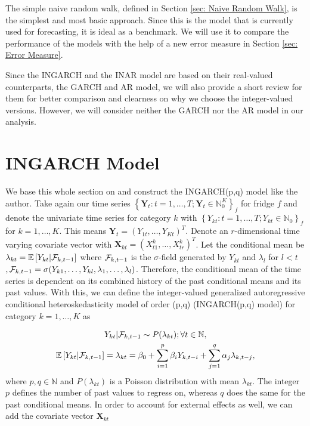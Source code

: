 The simple naive random walk, defined in Section \ref{sec: Naive Random Walk}, is the simplest and most basic approach. Since this is the model that is currently used for forecasting, it is ideal as a benchmark. We will use it to compare the performance of the models with the help of a new error measure in Section \ref{sec: Error Measure}. 

Since the INGARCH and the INAR model are based on their real-valued counterparts, the GARCH and AR model, we will also provide a short review for them for better comparison and clearness on why we choose the integer-valued versions. However, we will consider neither the GARCH nor the AR model in our analysis. 

\section{INGARCH Model}
\label{sec:Ingarch}

We base this whole section on \textcite{Liboschik:2016} and construct the INGARCH(p,q) model like the author. 
Take again our time series $\left\{\bm{Y}_t:t=1,\ldots,T; \bm{Y}_t \in \mathbb{N}_0^K \right\}_f$ for fridge $f$ and denote the univariate time series for category $k$ with $\left\{Y_{kt}:t=1,\ldots,T; Y_{kt} \in \mathbb{N}_0\right\}_f$  for $k=1,\ldots,K$. This means $\bm{Y}_t = (Y_{1t},\ldots,Y_{Kt})^T$. Denote an $r$-dimensional time varying covariate vector with $\textbf{X}_{kt}=(X_{t1}^k,\ldots,X_{tr}^k)^T$. Let the conditional mean be $\lambda_{kt} = \mathbb{E}\left[Y_{kt} | \mathcal{F}_{k,t-1} \right]$ where $\mathcal{F}_{k,t-1}$ is the $\sigma$-field generated by $Y_{kt}$ and $\lambda_l$ for $l<t$ $, \mathcal{F} _{k,t-1}= \sigma(Y_{k1},\ldots,Y_{kl},\lambda_1, \ldots, \lambda_l)$. Therefore, the conditional mean of the time series is dependent on its combined history of the past conditional means and its past values. With this, we can define the integer-valued generalized autoregressive conditional heteroskedasticity model of order (p,q) (INGARCH(p,q) model) for category $k=1,\ldots,K$ as

\begin{equation}
\begin{gathered}
\label{eq:Ingarch model}
Y_{kt} | \mathcal{F}_{k,t-1} \sim P(\lambda_{kt}); \forall t \in \mathbb{N}, \\
\mathbb{E}\left[Y_{kt} | \mathcal{F}_{k,t-1} \right] = \lambda_{kt} = \beta_0 + \sum_{i=1}^p\beta_i Y_{k,t-i} + \sum_{j=1}^q\alpha_j \lambda_{k,t-j},
\end{gathered}
\end{equation}
%
where $p,q \in \mathbb{N}$ and $P(\lambda_{kt})$ is a Poisson distribution with mean $\lambda_{kt}$. The integer $p$ defines the number of past values to regress on, whereas $q$ does the same for the past conditional means. In order to account for external effects as well, we can add the covariate vector $\textbf{X}_{kt}$

